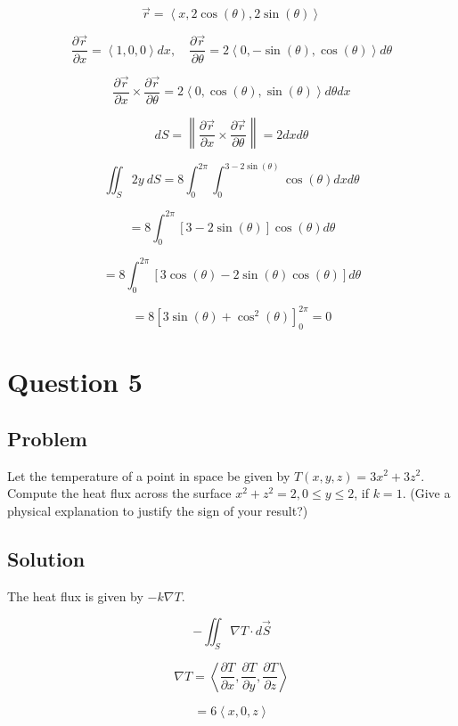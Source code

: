 \documentclass[12pt]{article}
\begin{document}
\[
    \vec{r} = \left\langle x, 2 \cos(\theta), 2 \sin(\theta)\right\rangle
\]

\[
    \frac{\partial \vec{r}}{\partial x} = \left\langle 1, 0, 0\right\rangle dx, \quad \frac{\partial \vec{r}}{\partial \theta} = 2 \left\langle 0, -\sin(\theta), \cos(\theta)\right\rangle d \theta
\]

\[
    \frac{\partial \vec{r}}{\partial x} \times \frac{\partial \vec{r}}{\partial \theta} = 2 \left\langle 0, \cos(\theta), \sin(\theta)\right\rangle d\theta dx
\]

\[
    dS
    = \left\lVert \frac{\partial \vec{r}}{\partial x} \times \frac{\partial \vec{r}}{\partial \theta} \right\rVert
    = 2 dx d\theta
\]

\[
    \iint_S 2y\ dS
    = 8 \int_{0}^{2\pi} \int_{0}^{3 - 2 \sin(\theta)} \cos(\theta) dx d\theta
\]

\[
    = 8 \int_{0}^{2\pi} \left[3 - 2 \sin(\theta)\right] \cos(\theta) d\theta
\]

\[
    = 8 \int_{0}^{2\pi} \left[3 \cos(\theta) - 2 \sin(\theta) \cos(\theta)\right] d\theta
\]

\[
    = 8 \left[3 \sin(\theta) + \cos^2(\theta)\right]_{0}^{2\pi}
    = 0
\]

\newpage
\section{Question 5}

\subsection{Problem}

Let the temperature of a point in space be given by \(T(x, y, z)= 3x^2 + 3z^2\).
Compute the heat flux across the surface \(x^2 + z^2 = 2, 0 \leq y \leq 2\), if \(k = 1\).
(Give a physical explanation to justify the sign of your result?)

\subsection{Solution}

The heat flux is given by \( -k \nabla T \).

\[
    - \iint_S \nabla T \cdot d\vec{S}
\]

\[
    \nabla T
    = \left\langle \frac{\partial T}{\partial x}, \frac{\partial T}{\partial y}, \frac{\partial T}{\partial z}\right\rangle
\]

\[
    = 6 \left\langle x, 0, z\right\rangle
\]
\end{document}
